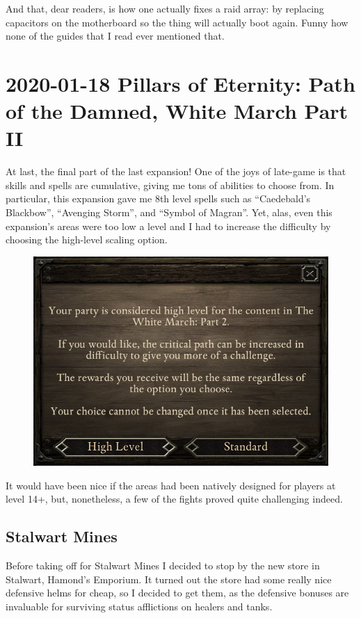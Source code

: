 \documentclass{article}
\begin{document}
And that, dear readers, is how one actually fixes a raid array: by replacing capacitors on the motherboard so the thing will actually boot again.  Funny how none of the guides that I read ever mentioned that.


\section{2020-01-18 Pillars of Eternity: Path of the Damned, White March Part II}
At last, the final part of the last expansion!  One of the joys of late-game is that skills and spells are cumulative, giving me tons of abilities to choose from.  In particular, this expansion gave me 8th level spells such as ``Caedebald's Blackbow'', ``Avenging Storm'', and ``Symbol of Magran''.  Yet, alas, even this expansion's areas were too low a level and I had to increase the difficulty by choosing the high-level scaling option.

\begin{figure}
\includegraphics[scale=0.7]{files/blog/2020_01_18_poe_potd_wmpt2/2020_01_18_highlevel.jpg}
\end{figure}

It would have been nice if the areas had been natively designed for players at level 14+, but, nonetheless, a few of the fights proved quite challenging indeed.

\subsection{Stalwart Mines}
Before taking off for Stalwart Mines I decided to stop by the new store in Stalwart, Hamond's Emporium.  It turned out the store had some really nice defensive helms for cheap, so I decided to get them, as the defensive bonuses are invaluable for surviving status afflictions on healers and tanks.
\end{document}
